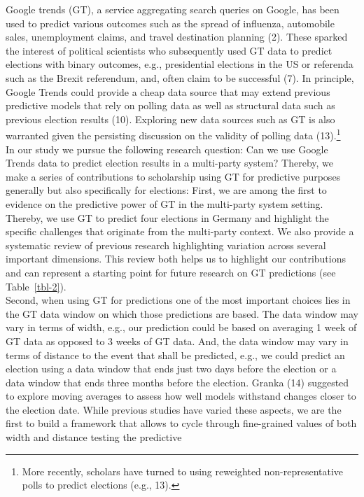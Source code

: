 \documentclass[
  letterpaper,
  DIV=11,
  numbers=noendperiod]{scrartcl}
\begin{document}
Google trends (GT), a service aggregating search queries on Google, has
been used to predict various outcomes such as the spread of influenza,
automobile sales, unemployment claims, and travel destination planning
(2). These sparked the interest of political scientists who subsequently
used GT data to predict elections with binary outcomes, e.g.,
presidential elections in the US or referenda such as the Brexit
referendum, and, often claim to be successful (7). In principle, Google
Trends could provide a cheap data source that may extend previous
predictive models that rely on polling data as well as structural data
such as previous election results (10). Exploring new data sources such
as GT is also warranted given the persisting discussion on the validity
of polling data (13).\footnote{More recently, scholars have turned to
  using reweighted non-representative polls to predict elections (e.g.,
  13).}\\
In our study we pursue the following research question: Can we use
Google Trends data to predict election results in a multi-party system?
Thereby, we make a series of contributions to scholarship using GT for
predictive purposes generally but also specifically for elections:
First, we are among the first to evidence on the predictive power of GT
in the multi-party system setting. Thereby, we use GT to predict four
elections in Germany and highlight the specific challenges that
originate from the multi-party context. We also provide a systematic
review of previous research highlighting variation across several
important dimensions. This review both helps us to highlight our
contributions and can represent a starting point for future research on
GT predictions (see Table~\ref{tbl-2}).\\
Second, when using GT for predictions one of the most important choices
lies in the GT data window on which those predictions are based. The
data window may vary in terms of width, e.g., our prediction could be
based on averaging 1 week of GT data as opposed to 3 weeks of GT data.
And, the data window may vary in terms of distance to the event that
shall be predicted, e.g., we could predict an election using a data
window that ends just two days before the election or a data window that
ends three months before the election. Granka (14) suggested to explore
moving averages to assess how well models withstand changes closer to
the election date. While previous studies have varied these aspects, we
are the first to build a framework that allows to cycle through
fine-grained values of both width and distance testing the predictive
\end{document}
